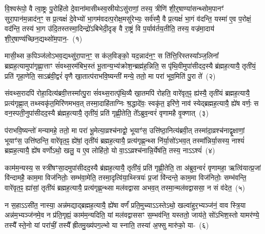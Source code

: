 \setcounter{anuvakam}{0}
वि॒श्वरू॑पो॒ वै त्वा॒ष्ट्रः पु॒रोहि॑तो दे॒वाना॑मासीथ्स्व॒स्रीयो\-ऽसु॑राणां॒ तस्य॒ त्रीणि॑ शी॒र्॒\mbox{}षाण्या॑सन्थ्सोम॒पानꣳ॑ सुरा॒पान॑म॒न्नाद॑न॒ꣳ॒ स प्र॒त्यक्षं॑ दे॒वेभ्यो॑ भा॒गम॑वदत्प॒रोक्ष॒मसु॑रेभ्यः॒ सर्व॑स्मै॒ वै प्र॒त्यक्षं॑ भा॒गं व॑दन्ति॒ यस्मा॑ ए॒व प॒रोक्षं॒ वद॑न्ति॒ तस्य॑ भा॒ग उ॑दि॒तस्तस्मा॒दिन्द्रो॑\-ऽबिभेदी॒दृङ् वै रा॒ष्ट्रं वि प॒र्याव॑र्तय॒तीति॒ तस्य॒ वज्र॑मा॒दाय॑ शी॒र्॒\mbox{}षाण्य॑च्छिन॒द्यथ्सो॑म॒पान॒-~(१)

मासी॒थ्स क॒पिञ्ज॑लो\-ऽभव॒द्यथ्सु॑रा॒पान॒ꣳ॒ स क॑ल॒विङ्को॒ यद॒न्नाद॑न॒ꣳ॒ स ति॑त्ति॒रिस्तस्या᳚ञ्ज॒लिना᳚ ब्रह्मह॒त्यामुपा॑गृह्णा॒त्ताꣳ सं॑वथ्स॒रम॑बिभ॒स्तं भू॒तान्य॒भ्य॑क्रोश॒न्ब्रह्म॑ह॒न्निति॒ स पृ॑थि॒वीमुपा॑सीद\-द॒स्यै ब्र॑ह्मह॒त्यायै॒ तृती॑यं॒ प्रति॑ गृहा॒णेति॒ साऽब्र॑वी॒द्वरं॑ वृणै खा॒तात्प॑रा\-भवि॒ष्यन्ती॑ मन्ये॒ ततो॒ मा परा॑ भूव॒मिति॑ पु॒रा ते॑~(२)

संवथ्स॒रादपि॑ रोहा॒दित्य॑ब्रवी॒त्तस्मा᳚त्पु॒रा सं॑वथ्स॒रात्पृ॑थि॒व्यै खा॒तमपि॑ रोहति॒ वारे॑वृत॒ꣴ॒ ह्य॑स्यै॒ तृती॑यं ब्रह्मह॒त्यायै॒ प्रत्य॑\-गृह्णा॒त् तथ्स्वकृ॑त॒मिरि॑णमभव॒त् तस्मा॒दाहि॑ताग्निः श्र॒द्धादे॑वः॒ स्वकृ॑त॒ इरि॑णे॒ नाव॑ स्येद्ब्रह्मह॒त्यायै॒ ह्ये॑ष वर्णः॒ स वन॒स्पती॒नुपा॑सीदद॒स्यै ब्र॑ह्मह॒त्यायै॒ तृती॑यं॒ प्रति॑ गृह्णी॒तेति॒ ते᳚\-ऽब्रुव॒न्वरं॑ वृणामहै वृ॒क्णात्~(३)

प॑राभवि॒ष्यन्तो॑ मन्यामहे॒ ततो॒ मा परा॑ भू॒मेत्या॒व्रश्च॑नाद्वो॒ भूयाꣳ॑स॒ उत्ति॑ष्ठा॒नित्य॑ब्रवी॒त् तस्मा॑दा॒व्रश्च॑नाद्वृ॒क्षाणां॒ भूयाꣳ॑स॒ उत्ति॑ष्ठन्ति॒ वारे॑वृत॒ꣴ॒ ह्ये॑षां॒ तृती॑यं ब्रह्मह॒त्यायै॒ प्रत्य॑\-गृह्ण॒न्थ्स नि॑र्या॒सो॑\-ऽभव॒त् तस्मा᳚न्निर्या॒सस्य॒ नाश्यं॑ ब्रह्मह॒त्यायै॒ ह्ये॑ष वर्णो\-ऽथो॒ खलु॒ य ए॒व लोहि॑तो॒ यो वा॒\-ऽ\-ऽव्रश्च॑नान्नि॒र्येष॑ति॒ तस्य॒ नाऽऽश्यं॑~(४)

काम॑म॒न्यस्य॒ स स्त्री॑षꣳसा॒दमुपा॑सीदद॒स्यै ब्र॑ह्मह॒त्यायै॒ तृती॑यं॒ प्रति॑ गृह्णी॒तेति॒ ता अ॑ब्रुव॒न्वरं॑ वृणामहा॒ ऋत्वि॑यात्प्र॒जां वि॑न्दामहै॒ काम॒मा विज॑नितोः॒ सम्भ॑वा॒मेति॒ तस्मा॒दृत्वि॑या॒थ्स्त्रियः॑ प्र॒जां वि॑न्दन्ते॒ काम॒मा विज॑नितोः॒ सम्भ॑वन्ति॒ वारे॑वृत॒ꣴ॒ ह्या॑सां॒ तृती॑यं ब्रह्मह॒त्यायै॒ प्रत्य॑\-गृह्ण॒न्थ्सा मल॑वद्वासा अभव॒त् तस्मा॒न्मल॑वद्वाससा॒ न सं व॑देत॒~(५)

न स॒हाऽऽसी॑त॒ नास्या॒ अन्न॑मद्याद्ब्रह्मह॒त्यायै॒ ह्ये॑षा वर्णं॑ प्रति॒मुच्याऽऽस्ते\-ऽथो॒ खल्वा॑हुर॒भ्यञ्ज॑नं॒ वाव स्त्रि॒या अन्न॑म॒भ्यञ्ज॑नमे॒व न प्र॑ति॒गृह्यं॒ काम॑म॒न्यदिति॒ यां मल॑वद्वाससꣳ स॒म्भव॑न्ति॒ यस्ततो॒ जाय॑ते॒ सो॑\-ऽभिश॒स्तो यामर॑ण्ये॒ तस्यै᳚ स्ते॒नो यां परा॑चीं॒ तस्यै᳚ ह्रीतमु॒ख्य॑पग॒ल्भो या स्नाति॒ तस्या॑ अ॒फ्सु मारु॑को॒ या-~(६)

